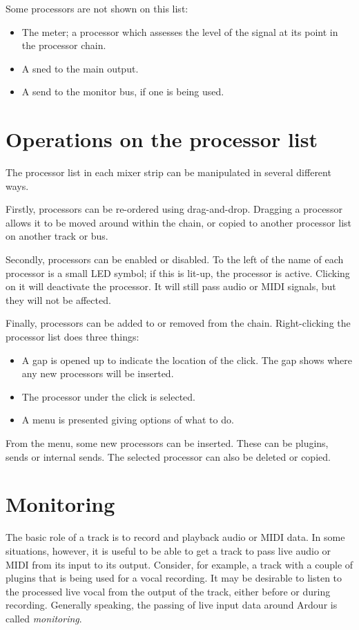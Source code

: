 \documentclass[10pt,a4paper]{book}
\begin{document}
Some processors are not shown on this list:

\begin{itemize}
\item The meter; a processor which assesses the level of the signal at
  its point in the processor chain.
\item A sned to the main output.
\item A send to the monitor bus, if one is being used.
\end{itemize}


\section{Operations on the processor list}

The processor list in each mixer strip can be manipulated in several
different ways.

Firstly, processors can be re-ordered using drag-and-drop.  Dragging a
processor allows it to be moved around within the chain, or copied to
another processor list on another track or bus.

Secondly, processors can be enabled or disabled.  To the left of the
name of each processor is a small LED symbol; if this is lit-up, the
processor is active.  Clicking on it will deactivate the processor.
It will still pass audio or MIDI signals, but they will not be
affected.

Finally, processors can be added to or removed from the chain.
Right-clicking the processor list does three things:

\begin{itemize}
\item A gap is opened up to indicate the location of the click.  The
  gap shows where any new processors will be inserted.
\item The processor under the click is selected.
\item A menu is presented giving options of what to do.
\end{itemize}

From the menu, some new processors can be inserted.  These can be
plugins, sends or internal sends.  The selected processor can also be
deleted or copied.



\section{Monitoring}

The basic role of a track is to record and playback audio or MIDI
data.  In some situations, however, it is useful to be able to get a
track to pass live audio or MIDI from its input to its output.
Consider, for example, a track with a couple of plugins that is being
used for a vocal recording.  It may be desirable to listen to the
processed live vocal from the output of the track, either before or
during recording.  Generally speaking, the passing of live input data
around Ardour is called \emph{monitoring}.
\end{document}
